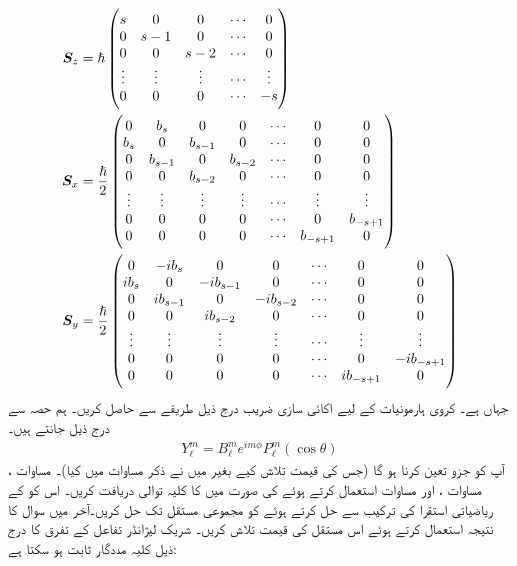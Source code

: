 \begin{align*}
 {\ensuremath{{\boldsymbol{S}}}}_z&=\hslash \begin{pmatrix}
 s&0&0&\cdots&0\\0&s-1&0&\cdots&0\\0&0&s-2&\cdots&0\\\vdots&\vdots&\vdots&\cdots&\vdots\\0&0&0&\cdots&-s
 \end{pmatrix} \\ 
 {{\boldsymbol{S}}}_x&=\frac{\hslash}{2}\begin{pmatrix}0&b_s&0&0&\cdots&0&0\\b_s&0&b_{s-1}&0&\cdots&0&0\\0&b_{s-1}&0&b_{s-2}&\cdots&0&0\\0&0&b_{s-2}&0&\cdots&0&0\\\vdots&\vdots&\vdots&\vdots&\cdots&\vdots&\vdots\\0&0&0&0&\cdots&0&b_{-s+1}\\0&0&0&0&\cdots&b_{-s+1}&0\end{pmatrix} \\
 {{\boldsymbol{S}}}_y&=\frac{\hslash}{2}\begin{pmatrix}0&-i b_s&0&0&\cdots&0&0\\i b_s&0&-i b_{s-1}&0&\cdots&0&0\\0&i b_{s-1}&0&-i b_{s-2}&\cdots&0&0\\0&0&i b_{s-2}&0&\cdots&0&0\\\vdots&\vdots&\vdots&\vdots&\cdots&\vdots&\vdots\\0&0&0&0&\cdots&0&-i b_{-s+1}\\0&0&0&0&\cdots&i b_{-s+1}&0
 \end{pmatrix}
\end{align*} 
جہاں  ہے۔
کروی ہارمونیات کے لیے اکائی سازی ضریب درج ذیل طریقے سے حاصل کریں۔ ہم حصہ سے درج ذیل جانتے ہیں۔
\begin{align*} 
 Y_{\ell}^{m}=B_{\ell}^{m}e^{i m\phi}P_{\ell} ^{m}(\cos\theta)
\end{align*} 
آپ کو جزو  تعین کرنا ہو گا (جس کی قیمت تلاش کیے بغیر میں نے ذکر مساوات  میں کیا)۔ مساوات ، مساوات ، اور مساوات  استعمال کرتے ہوئے  کی صورت میں  کا کلیہ توالی دریافت کریں۔ اس کو  کے ریاضیاتی استقرا کی ترکیب سے حل کرتے  ہوئے  کو مجموعی مستقل  تک حل کریں۔آخر میں سوال  کا نتیجہ استعمال کرتے ہوئے اس مستقل کی قیمت تلاش کریں۔ شریک لیژانڈر تفاعل کے تفرق کا درج ذیل کلیہ مددگار ثابت ہو سکتا ہے:

